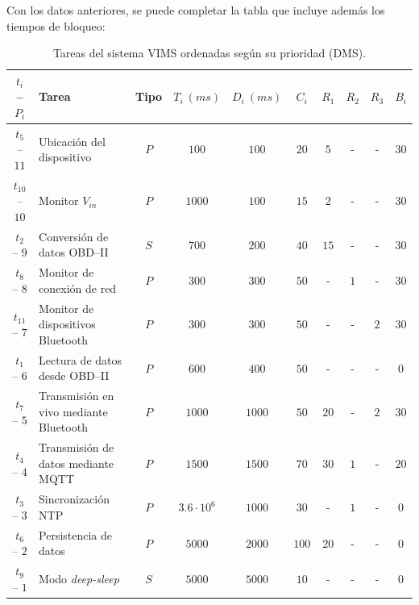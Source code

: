 Con los datos anteriores, se puede completar la tabla que incluye además los tiempos
de bloqueo:

\begin{table}[H]
  \centering
  \begin{tabularx}{\linewidth}{c|X|c|c|c|c|c|c|c|c}
    $t_i$ -- $P_i$   & \textbf{Tarea}                         & \textbf{Tipo} & $T_i~\left(ms\right)$ & $D_i~\left(ms\right)$ & $C_i$ & $R_1$ & $R_2$ & $R_3$ & $B_i$ \\
    \hline\hline
    $t_{5}$ -- $11$  & Ubicación del dispositivo              & $P$           & $100$                 & $100$                 & $20$  & $5$   & -     & -     & $30$  \\
    $t_{10}$ -- $10$ & Monitor $V_{in}$                       & $P$           & $1000$                & $100$                 & $15$  & $2$   & -     & -     & $30$  \\
    $t_{2}$ -- $9$   & Conversión de datos \ac{OBD}--II       & $S$           & $700$                 & $200$                 & $40$  & $15$  & -     & -     & $30$  \\
    $t_{8}$ -- $8$   & Monitor de conexión de red             & $P$           & $300$                 & $300$                 & $50$  & -     & $1$   & -     & $30$  \\
    $t_{11}$ -- $7$  & Monitor de dispositivos Bluetooth      & $P$           & $300$                 & $300$                 & $50$  & -     & -     & $2$   & $30$  \\
    $t_{1}$ -- $6$   & Lectura de datos desde \ac{OBD}--II    & $P$           & $600$                 & $400$                 & $50$  & -     & -     & -     & $0$   \\
    $t_{7}$ -- $5$   & Transmisión en vivo mediante Bluetooth & $P$           & $1000$                & $1000$                & $50$  & $20$  & -     & $2$   & $30$  \\
    $t_{4}$ -- $4$   & Transmisión de datos mediante MQTT     & $P$           & $1500$                & $1500$                & $70$  & $30$  & $1$   & -     & $20$  \\
    $t_{3}$ -- $3$   & Sincronización NTP                     & $P$           & $3.6 \cdot 10^6$      & $1000$                & $30$  & -     & $1$   & -     & $0$   \\
    $t_{6}$ -- $2$   & Persistencia de datos                  & $P$           & $5000$                & $2000$                & $100$ & $20$  & -     & -     & $0$   \\
    $t_{9}$ -- $1$   & Modo \textit{deep-sleep}               & $S$           & $5000$                & $5000$                & $10$  & -     & -     & -     & $0$   \\
    \hline
  \end{tabularx}
  \caption{Tareas del sistema \ac{VIMS} ordenadas según su prioridad (\ac{DMS}).}
  \label{tab:rt-table-block-times}
\end{table}

